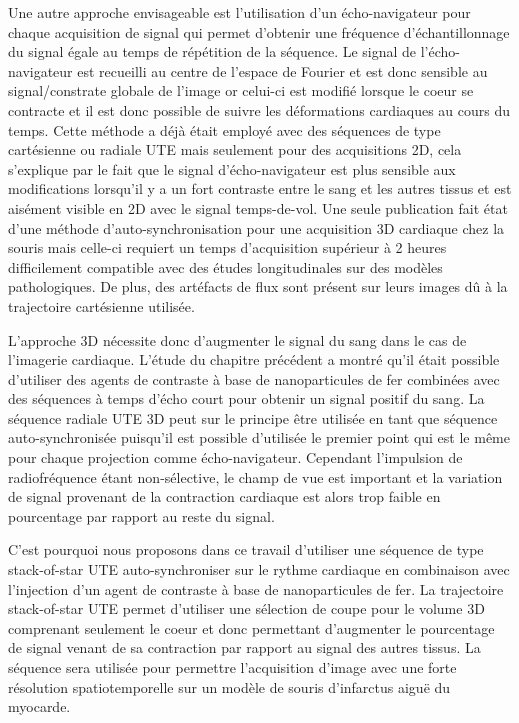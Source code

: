 Une autre approche envisageable est l'utilisation d'un écho-navigateur pour chaque acquisition de signal qui permet d'obtenir une fréquence d'échantillonnage du signal égale au temps de répétition de la séquence. Le signal de l'écho-navigateur est recueilli au centre de l'espace de Fourier et est donc sensible au signal/constrate globale de l'image or celui-ci est modifié lorsque le coeur se contracte et il est donc possible de suivre les déformations cardiaques au cours du temps. Cette méthode a déjà était employé avec des séquences de type cartésienne \cite{Bovens:2011aa} ou radiale UTE \cite{Hoerr:2013gf,Motaal:2015aa} mais seulement pour des acquisitions 2D, cela s'explique par le fait que le signal d'écho-navigateur est plus sensible aux modifications lorsqu'il y a un fort contraste entre le sang et les autres tissus et est aisément visible en 2D avec le signal temps-de-vol.
Une seule publication fait état d'une méthode d'auto-synchronisation pour une acquisition 3D cardiaque chez la souris \cite{Nieman:2009aa} mais celle-ci requiert un temps d'acquisition supérieur à 2 heures difficilement compatible avec des études longitudinales sur des modèles pathologiques. De plus, des artéfacts de flux sont présent sur leurs images dû à la trajectoire cartésienne utilisée.

L'approche 3D nécessite donc d'augmenter le signal du sang dans le cas de l'imagerie cardiaque. L'étude du chapitre précédent a montré qu'il était possible d'utiliser des agents de contraste à base de nanoparticules de fer combinées avec des séquences à temps d'écho court pour obtenir un signal positif du sang. La séquence radiale UTE 3D peut sur le principe être utilisée en tant que séquence auto-synchronisée puisqu'il est possible d'utilisée le premier point qui est le même pour chaque projection comme écho-navigateur. Cependant l'impulsion de radiofréquence étant non-sélective, le champ de vue est important et la variation de signal provenant de la contraction cardiaque est alors trop faible en pourcentage par rapport au reste du signal. 

C'est pourquoi nous proposons dans ce travail d'utiliser une séquence de type stack-of-star UTE auto-synchroniser sur le rythme cardiaque en combinaison avec l'injection d'un agent de contraste à base de nanoparticules de fer. La trajectoire stack-of-star UTE permet d'utiliser une sélection de coupe pour le volume 3D comprenant seulement le coeur et donc permettant d'augmenter le pourcentage de signal venant de sa contraction par rapport au signal des autres tissus. La séquence sera utilisée pour permettre l'acquisition d'image avec une forte résolution spatiotemporelle sur un modèle de souris d'infarctus aiguë du myocarde.

